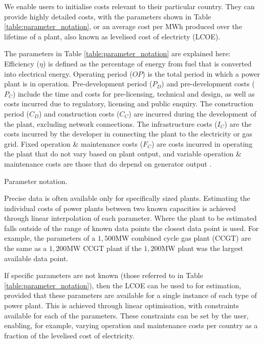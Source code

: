 We enable users to initialise costs relevant to their particular country. They can provide highly detailed costs, with the parameters shown in Table \ref{table:parameter_notation}, or an average cost per MWh produced over the lifetime of a plant, also known as levelised cost of electricty (LCOE).

The parameters in Table \ref{table:parameter_notation} are explained here: Efficiency ($\eta$) is defined as the percentage of energy from fuel that is converted into electrical energy. Operating period ($OP$) is the total period in which a power plant is in operation. Pre-development period ($P_D$) and pre-development costs ($P_C$) include the time and costs for pre-licensing, technical and design, as well as costs incurred due to regulatory, licensing and public enquiry. The construction period ($C_D$) and construction costs ($C_C$) are incurred during the development of the plant, excluding network connections. The infrastructure costs ($I_C$) are the costs incurred by the developer in connecting the plant to the electricity or gas grid. Fixed operation \& maintenance costs ($F_C$) are costs incurred in operating the plant that do not vary based on plant output, and variable operation \& maintenance costs are those that do depend on generator output \cite{Ltd2016}.



\begin{table}[h]
	\centering
	\caption{Parameter notation.}
	\label{table:parameter_notation}
\end{table}

Precise data is often available only for specifically sized plants. Estimating the individual costs of power plants between two known capacities is achieved through linear interpolation of each parameter. Where the plant to be estimated falls outside of the range of known data points the closest data point is used. For example, the parameters of a $1,500$MW combined cycle gas plant (CCGT) are the same as a $1,200$MW CCGT plant if the $1,200$MW plant was the largest available data point. 

If specific parameters are not known (those referred to in Table \ref{table:parameter_notation}), then the LCOE can be used to for estimation, provided that these parameters are available for a single instance of each type of power plant. This is achieved through linear optimisation, with constraints available for each of the parameters. These constraints can be set by the user, enabling, for example, varying operation and maintenance costs per country as a fraction of the levelised cost of electricity.


